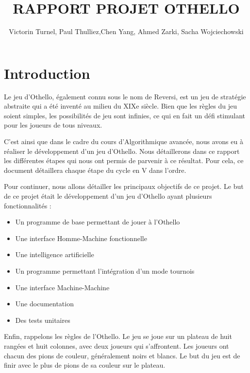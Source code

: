 \documentclass{article}
\title{RAPPORT PROJET OTHELLO}
\author{Victorin Turnel, Paul Thulliez,Chen Yang, Ahmed Zarki, Sacha Wojciechowski}
\begin{document}
\maketitle
\newpage
\tableofcontents

\newpage

\section{Introduction}
Le jeu d'Othello, également connu sous le nom de Reversi, est un jeu de stratégie abstraite qui a été inventé au milieu du XIXe siècle. Bien que les règles du jeu soient simples, les possibilités de jeu sont infinies, ce qui en fait un défi stimulant pour les joueurs de tous niveaux.

\vspace{5mm}

C'est ainsi que dans le cadre du cours d'Algorithmique avancée, nous avons eu à réaliser le développement d'un jeu d'Othello. Nous détaillerons dans ce rapport les différentes étapes qui nous ont permis de parvenir à ce résultat. Pour cela, ce document détaillera chaque étape du cycle en V dans l'ordre. 

\vspace{5mm}

Pour continuer, nous allons détailler les principaux objectifs de ce projet. Le but de ce projet était le développement d'un jeu d'Othello ayant plusieurs fonctionnalités :
\begin{itemize}
    \item Un programme de base permettant de jouer à l'Othello
    \item Une interface Homme-Machine fonctionnelle
    \item Une intelligence artificielle
    \item Un programme permettant l'intégration d'un mode tournois
    \item Une interface Machine-Machine
    \item Une documentation
    \item Des tests unitaires
\end{itemize}

\vspace{5mm}


Enfin, rappelons les règles de l'Othello. Le jeu se joue sur un plateau de huit rangées et huit colonnes, avec deux joueurs qui s'affrontent. Les joueurs ont chacun des pions de couleur, généralement noirs et blancs. Le but du jeu est de finir avec le plus de pions de sa couleur sur le plateau.
\end{document}
